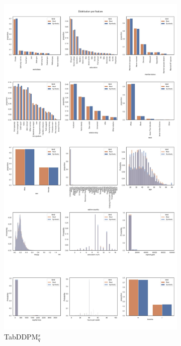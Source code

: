 \begin{landscape}
\begin{figure}[h]
		\hfill
		\begin{subfigure}{0.3\linewidth}
			\includegraphics[height=\textheight,width=\linewidth,keepaspectratio]{images/distributions_full/tab-ddpm-simTune.jpg}
			\caption{TabDDPM$^{s}_q$}
		\end{subfigure}
		\hfill
		\begin{subfigure}{0.3\linewidth}

\end{subfigure}
\end{figure}
\end{landscape}
